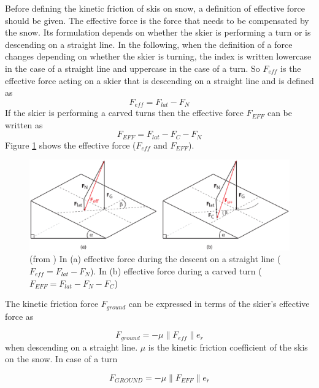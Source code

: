 \documentclass[12pt,a4paper,twoside]{book}
\newcommand{\norm}[1]{\lVert#1\rVert}
\begin{document}
Before defining the kinetic friction of skis on snow, a definition of effective force should be given. The effective force is the force that needs to be compensated by the snow. Its formulation depends on whether the skier is performing a turn or is descending on a straight line. In the following, when the definition of a force changes depending on whether the skier is turning, the index is written lowercase in the case of a straight line and uppercase in the case of a turn. So $F_{eff}$ is the effective force acting on a skier that is descending on a straight line and is defined as
\begin{equation}
F_{eff}=F_{lat}-F_N
\end{equation}
If the skier is performing a carved turns then the effective force $F_{EFF}$ can be written as
\begin{equation}
F_{EFF}=F_{lat}-F_C-F_N
\end{equation}
Figure \ref{effective_force_pic} shows the effective force ($F_{eff}$ and $F_{EFF}$).

\begin{figure}
  \begin{center}
    \includegraphics[width=\textwidth]{images/figure6.eps}
    \caption{(from \cite{hol2012}) In (a) effective force during the descent on a straight line ($F_{eff}=F_{lat}-F_N$). In (b) effective force during a carved turn ($F_{EFF}=F_{lat}-F_N-F_C$)}\label{effective_force_pic}
  \end{center}
\end{figure}

The kinetic friction force $F_{ground}$ can be expressed in terms of the skier's effective force as

\begin{equation}
F_{ground}=-\mu \norm{F_{eff}}e_{\dot{r}}
\end{equation}
when descending on a straight line. $\mu$ is the kinetic friction coefficient of the skis on the snow. In case of a turn

\begin{equation}
F_{GROUND}=-\mu \norm{F_{EFF}}e_{\dot{r}}
\end{equation}
\end{document}

